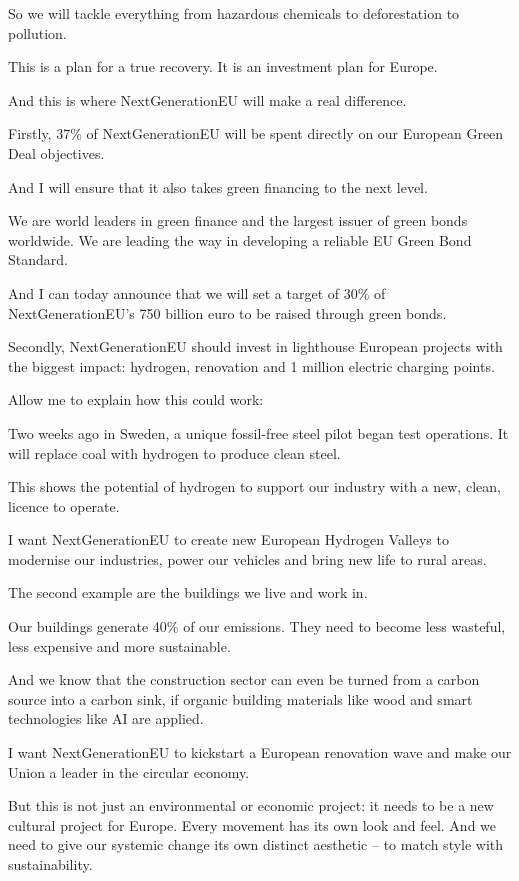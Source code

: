 \documentclass[a4paper,11pt]{article}
\begin{document}
So we will tackle everything from hazardous chemicals to deforestation to pollution.

This is a plan for a true recovery. It is an investment plan for Europe.

And this is where NextGenerationEU will make a real difference.

Firstly, 37\% of NextGenerationEU will be spent directly on our European Green Deal objectives.

And I will ensure that it also takes green financing to the next level.

We are world leaders in green finance and the largest issuer of green bonds worldwide. We are leading the way in developing a reliable EU Green Bond Standard.

And I can today announce that we will set a target of 30\% of NextGenerationEU's 750 billion euro to be raised through green bonds.

Secondly, NextGenerationEU should invest in lighthouse European projects with the biggest impact: hydrogen, renovation and 1 million electric charging points.

Allow me to explain how this could work: 

Two weeks ago in Sweden, a unique fossil-free steel pilot began test operations. It will replace coal with hydrogen to produce clean steel.

This shows the potential of hydrogen to support our industry with a new, clean, licence to operate.

I want NextGenerationEU to create new European Hydrogen Valleys to modernise our industries, power our vehicles and bring new life to rural areas.

The second example are the buildings we live and work in.

Our buildings generate 40\% of our emissions. They need to become less wasteful, less expensive and more sustainable.

And we know that the construction sector can even be turned from a carbon source into a carbon sink, if organic building materials like wood and smart technologies like AI are applied.

I want NextGenerationEU to kickstart a European renovation wave and make our Union a leader in the circular economy. 

But this is not just an environmental or economic project: it needs to be a new cultural project for Europe. Every movement has its own look and feel. And we need to give our systemic change its own distinct aesthetic – to match style with sustainability.
\end{document}
